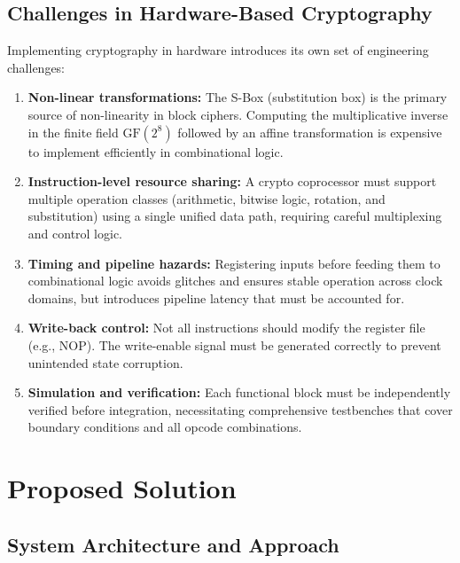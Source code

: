 \documentclass[12pt, a4paper]{report}
\begin{document}
\subsection{Challenges in Hardware-Based Cryptography}

Implementing cryptography in hardware introduces its own set of engineering challenges:

\begin{enumerate}[label=\arabic*.]
  \item \textbf{Non-linear transformations:} The S-Box (substitution box) is the primary
        source of non-linearity in block ciphers. Computing the multiplicative inverse in
        the finite field $\mathrm{GF}(2^8)$ followed by an affine transformation is
        expensive to implement efficiently in combinational logic.

  \item \textbf{Instruction-level resource sharing:} A crypto coprocessor must support
        multiple operation classes (arithmetic, bitwise logic, rotation, and substitution)
        using a single unified data path, requiring careful multiplexing and control logic.

  \item \textbf{Timing and pipeline hazards:} Registering inputs before feeding them to
        combinational logic avoids glitches and ensures stable operation across clock
        domains, but introduces pipeline latency that must be accounted for.

  \item \textbf{Write-back control:} Not all instructions should modify the register file
        (e.g., NOP). The write-enable signal must be generated correctly to prevent
        unintended state corruption.

  \item \textbf{Simulation and verification:} Each functional block must be independently
        verified before integration, necessitating comprehensive testbenches that cover
        boundary conditions and all opcode combinations.
\end{enumerate}

\section{Proposed Solution}

\subsection{System Architecture and Approach}
\end{document}
